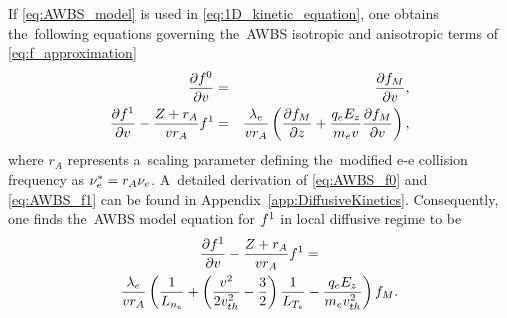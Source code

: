 If \eqref{eq:AWBS_model} is used in \eqref{eq:1D_kinetic_equation}, one obtains
the~following equations governing the~AWBS isotropic and anisotropic terms of 
\eqref{eq:f_approximation}
\begin{eqnarray}
  \frac{\partial{f^0}}{\partial{v}} &=& \frac{\partial{f_M}}{\partial{v}} ,
  \label{eq:AWBS_f0} \\
  \frac{\partial{f^1}}{\partial{v}}  
  - \frac{Z +  r_A}{v r_A} f^1 &=& 
  \frac{\lambda_e}{v r_A}
  \left(\frac{\partial{f_M}}{\partial{z}} + \frac{q_eE_z}{m_ev}\frac{\partial{f_M}}{\partial{v}}\right) ,
  \label{eq:AWBS_f1} 
\end{eqnarray}
where $ r_A$ represents a~scaling parameter defining the~modified
e-e collision frequency as $\nu_{e}^* =  r_A \nu_{e}$.
A~detailed derivation of \eqref{eq:AWBS_f0} and \eqref{eq:AWBS_f1} 
can be found in Appendix~\ref{app:DiffusiveKinetics}.
Consequently, one finds the~AWBS model equation for $f^1$ 
in local diffusive regime to be
\begin{multline}
  \frac{\partial{f^1}}{\partial{v}} 
  - \frac{Z +  r_A}{v r_A}f^1
  = \\
  \frac{\lambda_e}{v r_A}\left(\frac{1}{L_{n_e}} + 
  \left( \frac{v^2}{2 v_{th}^2} - \frac{3}{2}\right)
  \frac{1}{L_{T_e}} - \frac{q_eE_z}{m_ev_{th}^2}\right)f_M .
  \label{eq:AWBS_f1_ODE}
\end{multline}
